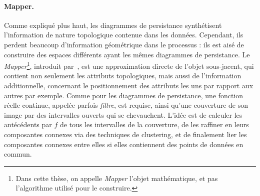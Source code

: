 \paragraph*{Mapper.} Comme expliqu\'e plus haut, les diagrammes de persistance synth\'etisent l'information de nature topologique 
contenue dans les donn\'ees.
Cependant, ils perdent beaucoup d'information g\'eom\'etrique dans le processus : ils est ais\'e de construire des espaces diff\'erents ayant les 
m\^emes diagrammes de persistance. Le {\em Mapper}\footnote{Dans cette th\`ese, on appelle {\em Mapper} l'objet math\'ematique,
et pas l'algorithme utilis\'e pour le construire.}, introduit par~\cite{Singh07}, est une approximation directe de l'objet sous-jacent,
qui contient non seulement les attributs topologiques, mais aussi de l'information additionnelle, concernant le positionnement des
attributs les uns par rapport aux autres par exemple. Comme pour les diagrammes de persistance, une fonction r\'eelle continue, appel\'ee parfois
{\em filtre}, est requise, ainsi qu'une couverture de son image par des intervalles ouverts qui se chevauchent. 
L'id\'ee est de calculer les ant\'ec\'edents par $f$ de tous les intervalles de la couverture, de les raffiner en leurs composantes connexes via des techniques
de clustering, et de finalement lier les composantes connexes entre elles si elles contiennent des points de donn\'ees en commun.
 




